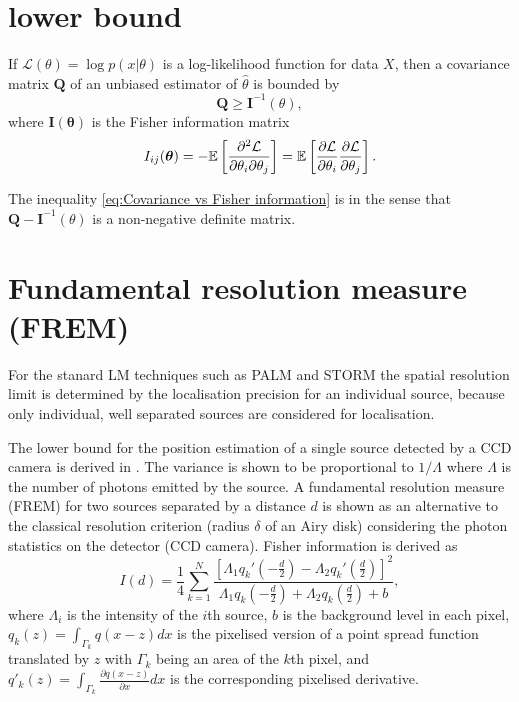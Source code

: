 
\section{\CR lower bound}

If $\mathcal{L}(\theta)=\log p(x|\theta)$ is a log-likelihood function for data $X$, then a covariance matrix $\bm{Q}$ of an unbiased estimator of $\hat{\theta}$ is bounded by \cite{Rao1945,Cover1991} 
%
\begin{equation}
	\bm{Q}\geq\bm{I}^{-1}(\theta),
	\label{eq:Covariance vs Fisher information}
\end{equation}
%
where $\bm{I}(\bm{\theta})$ is the Fisher information matrix 
%
\begin{equation}
	I_{ij}(\bm{\theta})=-\mathbb{E}\left[\frac{\partial^2\mathcal{L}}{\partial\theta_i\partial\theta_j}\right]=\mathbb{E}\left[\frac{\partial\mathcal{L}}{\partial\theta_i}\frac{\partial\mathcal{L}}{\partial\theta_j}\right].
	\label{eq:Fisher information general}
\end{equation}

The inequality \autoref{eq:Covariance vs Fisher information} is in the sense that $\bm{Q}-\bm{I}^{-1}(\theta)$ is a non-negative definite matrix.


\section{Fundamental resolution measure (FREM)}

For the stanard LM techniques such as PALM and STORM  the spatial resolution limit is determined by the localisation precision for an individual source, because only individual, well separated sources are considered for localisation. 

The \CR lower bound for the position estimation of a single source detected by a CCD camera is derived in \cite{Ram2006,Ram2006b}. The variance is shown to be proportional to $1/\Lambda$ where $\Lambda$ is the number of photons emitted by the source. A fundamental resolution measure (FREM) for two sources separated by a distance $d$ is shown as an alternative to the classical resolution criterion (radius $\delta$ of an Airy disk) considering the photon statistics on the detector (CCD camera). Fisher information is derived as
%
\begin{equation}
	I(d)=\frac{1}{4}\sum_{k=1}^N\frac{\left[\Lambda_1q_k'(-\frac{d}{2})-\Lambda_2q_k'(\frac{d}{2})\right]^2}{\Lambda_1q_k(-\frac{d}{2})+\Lambda_2q_k(\frac{d}{2})+b},
	\label{eq:Ram FREM}
\end{equation}
%
where $\Lambda_i$ is the intensity of the $i$th source, $b$ is the background level in each pixel, $q_k(z)=\int_{\Gamma_k}q(x-z)dx$ is the pixelised version of a point spread function translated by $z$ with $\Gamma_k$ being an area of the $k$th pixel, and $q'_k(z)=\int_{\Gamma_k}\frac{\partial q(x-z)}{\partial x}dx$ is the corresponding pixelised derivative. 


